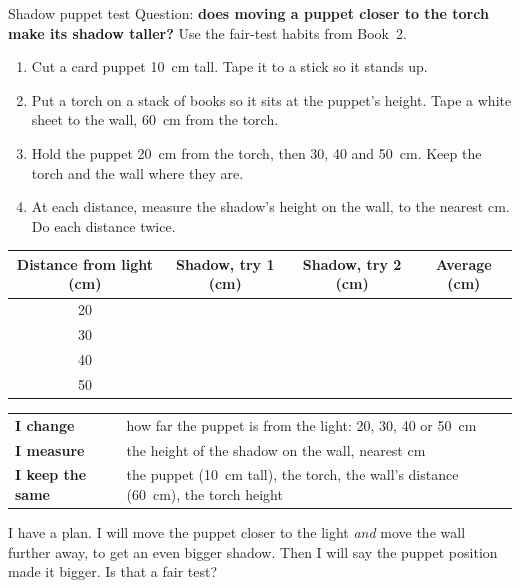 \begin{tryit}{Shadow puppet test}
Question: \textbf{does moving a puppet closer to the torch make its shadow taller?} Use the fair-test habits from Book~2.
\begin{enumerate}[leftmargin=1.6em]
\item Cut a card puppet 10~cm tall. Tape it to a stick so it stands up.
\item Put a torch on a stack of books so it sits at the puppet's height. Tape a white sheet to the wall, 60~cm from the torch.
\item Hold the puppet 20~cm from the torch, then 30, 40 and 50~cm. Keep the torch and the wall where they are.
\item At each distance, measure the shadow's height on the wall, to the nearest cm. Do each distance twice.
\end{enumerate}
\par\medskip
\renewcommand{\arraystretch}{1.6}
\begin{tabular}{|c|c|c|c|}
\hline
\textbf{Distance from light (cm)} & \textbf{Shadow, try 1 (cm)} & \textbf{Shadow, try 2 (cm)} & \textbf{Average (cm)}\\ \hline
20 & & & \\ \hline
30 & & & \\ \hline
40 & & & \\ \hline
50 & & & \\ \hline
\end{tabular}
\end{tryit}

\begin{center}
\sffamily\small\renewcommand{\arraystretch}{1.4}
\begin{tabular}{@{}p{3.4cm}p{7.6cm}@{}}
\toprule
\textbf{I change} & how far the puppet is from the light: 20, 30, 40 or 50~cm\\
\textbf{I measure} & the height of the shadow on the wall, nearest cm\\
\textbf{I keep the same} & the puppet (10~cm tall), the torch, the wall's distance (60~cm), the torch height\\
\bottomrule
\end{tabular}
\end{center}

\begin{multix}[hmm]\multixbot[hmm]\tcblower
I have a plan. I will move the puppet closer to the light \emph{and} move the wall further away, to get an even bigger shadow. Then I will say the puppet position made it bigger. Is that a fair test?
\end{multix}

